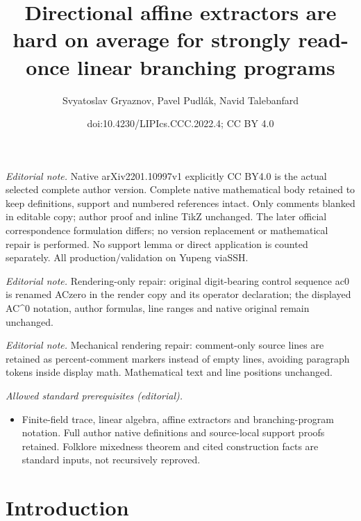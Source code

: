 \documentclass[10pt,a4paper]{article}
\title{Directional affine extractors are hard on average for strongly read-once linear branching programs}
\author{Svyatoslav Gryaznov, Pavel Pudlák, Navid Talebanfard}
\date{doi:10.4230/LIPIcs.CCC.2022.4; CC BY 4.0}
\theoremstyle{definition}
\theoremstyle{remark}
\begin{document}
\maketitle
\noindent\textit{Editorial note.} Native arXiv2201.10997v1 explicitly CC BY4.0 is the actual selected complete author version. Complete native mathematical body retained to keep definitions, support and numbered references intact. Only comments blanked in editable copy; author proof and inline TikZ unchanged. The later official correspondence formulation differs; no version replacement or mathematical repair is performed. No support lemma or direct application is counted separately. All production/validation on Yupeng viaSSH.\par\medskip
\noindent\textit{Editorial note.} Rendering-only repair: original digit-bearing control sequence ac0 is renamed ACzero in the render copy and its operator declaration; the displayed AC\textasciicircum{}0 notation, author formulas, line ranges and native original remain unchanged.\par\medskip
\noindent\textit{Editorial note.} Mechanical rendering repair: comment-only source lines are retained as percent-comment markers instead of empty lines, avoiding paragraph tokens inside display math. Mathematical text and line positions unchanged.\par\medskip
\noindent\textit{Allowed standard prerequisites (editorial).}\begin{itemize}
\item Finite-field trace, linear algebra, affine extractors and branching-program notation. Full author native definitions and source-local support proofs retained. Folklore mixedness theorem and cited construction facts are standard inputs, not recursively reproved.
\end{itemize}\medskip
\section{Introduction}
\end{document}
